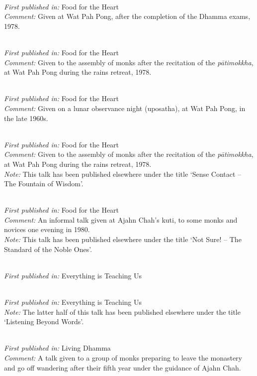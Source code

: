 { \\
\textit{First published in:} Food for the Heart \\
\textit{Comment:} Given at Wat Pah Pong, after the completion of the Dhamma exams, 1978.

 \\
\textit{First published in:} Food for the Heart \\
\textit{Comment:} Given to the assembly of monks after the recitation of the \textit{p\=ati\-mokkha}, at Wat Pah Pong during the rains retreat, 1978.

 \\
\textit{First published in:} Food for the Heart \\
\textit{Comment:} Given on a lunar observance night (uposatha), at Wat Pah Pong, in the late 1960s.

 \\
\textit{First published in:} Food for the Heart \\
\textit{Comment:} Given to the assembly of monks after the recitation of the \textit{p\=ati\-mokkha}, at Wat Pah Pong during the rains retreat, 1978. \\
\textit{Note:} This talk has been published elsewhere under the title `Sense Contact -- The Fountain of Wisdom'.

 \\
\textit{First published in:} Food for the Heart \\
\textit{Comment:} An informal talk given at Ajahn Chah's kuti, to some monks and novices one evening in 1980. \\
\textit{Note:} This talk has been published elsewhere under the title `Not Sure! -- The Standard of the Noble Ones'.

 \\
\textit{First published in:} Everything is Teaching Us

 \\
\textit{First published in:} Everything is Teaching Us \\
\textit{Note:} The latter half of this talk has been published elsewhere under the title `Listening Beyond Words'.

 \\
\textit{First published in:} Living Dhamma \\
\textit{Comment:} A talk given to a group of monks preparing to leave the monastery and go off wandering after their fifth year under the guidance of Ajahn Chah.

}
